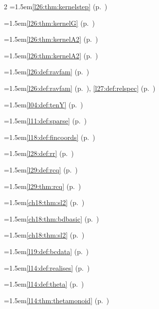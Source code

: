 \begin{multicols}{2}
\hangindent=1.5em\quad \ref{l26:thm:kernelstep} (p.~\pageref{l26:thm:kernelstep})\par
\hangindent=1.5em\quad \ref{l26:thm:kernelG} (p.~\pageref{l26:thm:kernelG})\par
\hangindent=1.5em\quad \ref{l26:thm:kernelA2} (p.~\pageref{l26:thm:kernelA2})\par
\hangindent=1.5em\quad \ref{l26:thm:kernelA2} (p.~\pageref{l26:thm:kernelA2})\par
\hangindent=1.5em\quad \ref{l26:def:ravfam} (p.~\pageref{l26:def:ravfam})\par
\hangindent=1.5em\quad \ref{l26:def:ravfam} (p.~\pageref{l26:def:ravfam}), \ref{l27:def:relspec} (p.~\pageref{l27:def:relspec})\par
\hangindent=1.5em\quad \ref{l04:def:tenY} (p.~\pageref{l04:def:tenY})\par
\hangindent=1.5em\quad \ref{l11:def:sparse} (p.~\pageref{l11:def:sparse})\par
\hangindent=1.5em\quad \ref{l18:def:fincoords} (p.~\pageref{l18:def:fincoords})\par
\hangindent=1.5em\quad \ref{l28:def:rr} (p.~\pageref{l28:def:rr})\par
\hangindent=1.5em\quad \ref{l29:def:rcq} (p.~\pageref{l29:def:rcq})\par
\hangindent=1.5em\quad \ref{l29:thm:rcq} (p.~\pageref{l29:thm:rcq})\par
\hangindent=1.5em\quad \ref{ch18:thm:sl2} (p.~\pageref{ch18:thm:sl2})\par
\hangindent=1.5em\quad \ref{ch18:thm:bdbasic} (p.~\pageref{ch18:thm:bdbasic})\par
\hangindent=1.5em\quad \ref{ch18:thm:sl2} (p.~\pageref{ch18:thm:sl2})\par
\hangindent=1.5em\quad \ref{l19:def:bcdata} (p.~\pageref{l19:def:bcdata})\par
\hangindent=1.5em\quad \ref{l14:def:realises} (p.~\pageref{l14:def:realises})\par
\hangindent=1.5em\quad \ref{l14:def:theta} (p.~\pageref{l14:def:theta})\par
\hangindent=1.5em\quad \ref{l14:thm:thetamonoid} (p.~\pageref{l14:thm:thetamonoid})\par

\end{multicols}

